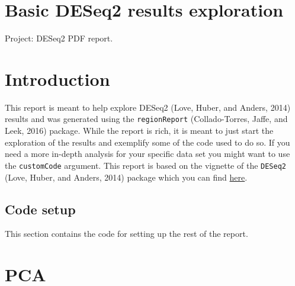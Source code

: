 \documentclass[]{article}
\title{}
\author{}
\date{}
\newenvironment{Shaded}{\begin{snugshade}}{\end{snugshade}}
\newcommand{\KeywordTok}[1]{\textcolor[rgb]{0.13,0.29,0.53}{\textbf{#1}}}
\newcommand{\DataTypeTok}[1]{\textcolor[rgb]{0.13,0.29,0.53}{#1}}
\newcommand{\StringTok}[1]{\textcolor[rgb]{0.31,0.60,0.02}{#1}}
\newcommand{\OtherTok}[1]{\textcolor[rgb]{0.56,0.35,0.01}{#1}}
\newcommand{\ControlFlowTok}[1]{\textcolor[rgb]{0.13,0.29,0.53}{\textbf{#1}}}
\newcommand{\OperatorTok}[1]{\textcolor[rgb]{0.81,0.36,0.00}{\textbf{#1}}}
\newcommand{\NormalTok}[1]{#1}
\begin{document}
{
\setcounter{tocdepth}{2}
\tableofcontents
}
\section{Basic DESeq2 results
exploration}\label{basic-deseq2-results-exploration}

Project: DESeq2 PDF report.

\section{Introduction}\label{introduction}

This report is meant to help explore DESeq2 (Love, Huber, and Anders,
2014) results and was generated using the \texttt{regionReport}
(Collado-Torres, Jaffe, and Leek, 2016) package. While the report is
rich, it is meant to just start the exploration of the results and
exemplify some of the code used to do so. If you need a more in-depth
analysis for your specific data set you might want to use the
\texttt{customCode} argument. This report is based on the vignette of
the \texttt{DESeq2} (Love, Huber, and Anders, 2014) package which you
can find \href{http://www.bioconductor.org/packages/DESeq2}{here}.

\subsection{Code setup}\label{code-setup}

This section contains the code for setting up the rest of the report.

\begin{Shaded}
\end{Shaded}

\section{PCA}\label{pca}
\end{document}
